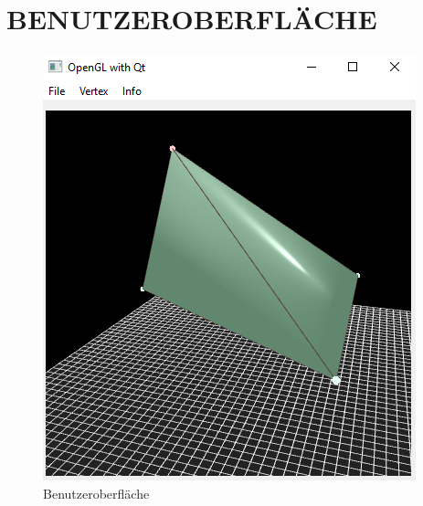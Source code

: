	
	\section{\Large BENUTZEROBERFLÄCHE}

	\begin{figure}[H]
	\centering
	\includegraphics[width=0.7\linewidth]{GUI.png}
	\caption{Benutzeroberfläche}
	\label{fig8}
	\end{figure}
	

	

		